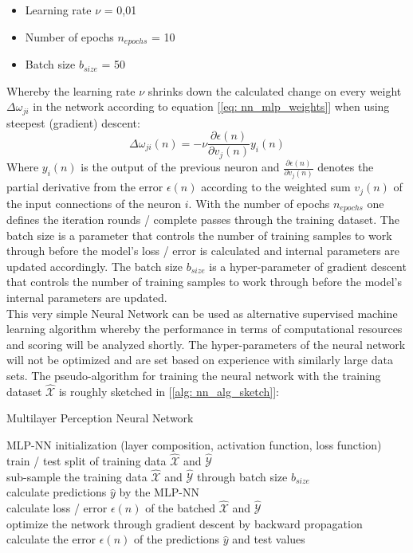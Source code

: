 \documentclass[12pt, a4paper]{article}
\begin{document}
\begin{itemize}
    \item Learning rate $\nu$ = 0,01
    \item Number of epochs $n_{epochs}$ = 10
    \item Batch size $b_{size}$ = 50
\end{itemize}
Whereby the learning rate $\nu$ shrinks down the calculated change on every weight $\Delta \omega_{ji}$ in the network according to equation [\ref{eq: nn_mlp_weights}] when using steepest (gradient) descent:
\begin{equation}
    \label{eq: nn_mlp_weights}
    \Delta \omega_{ji}(n) = - \nu \frac{\partial \epsilon(n)}{\partial v_j(n)} y_i(n)
\end{equation}
Where $y_i(n)$ is the output of the previous neuron and $\frac{\partial \epsilon(n)}{\partial v_j(n)}$ denotes the partial derivative from the error $\epsilon(n)$ according to the weighted sum $v_j(n)$ of the input connections of the neuron $i$.
With the number of epochs $n_{epochs}$ one defines the iteration rounds / complete passes through the training dataset. The batch size is a parameter that controls the number of training samples to work through before the model's loss / error is calculated and internal parameters are updated accordingly. The batch size $b_{size}$ is a hyper-parameter of gradient descent that controls the number of training samples to work through before the model’s internal parameters are updated. \\
This very simple Neural Network can be used as alternative supervised machine learning algorithm whereby the performance in terms of computational resources and scoring will be analyzed shortly. The hyper-parameters of the neural network will not be optimized and are set based on experience with similarly large data sets. The pseudo-algorithm for training the neural network with the training dataset $\hat{\mathcal{X}}$ is roughly sketched in [\ref{alg: nn_alg_sketch}]:
\begin{algorithm}
\caption{Multilayer Perception Neural Network}
\label{alg: nn_alg_sketch}
    MLP-NN initialization (layer composition, activation function, loss function)\\
    train / test split of training data $\hat{\mathcal{X}}$ and $\hat{\mathcal{Y}}$ \\
    {
    {
    sub-sample the training data $\hat{\mathcal{X}}$ and $\hat{\mathcal{Y}}$ through batch size $b_{size}$ \\
    calculate predictions $\hat{y}$ by the MLP-NN \\
    calculate loss / error $\epsilon(n)$ of the batched $\hat{\mathcal{X}}$ and $\hat{\mathcal{Y}}$\\
    optimize the network through gradient descent by backward propagation \\
    }
    calculate the error $\epsilon(n)$ of the predictions $\hat{y}$ and test values
    }
\end{algorithm}
\end{document}
